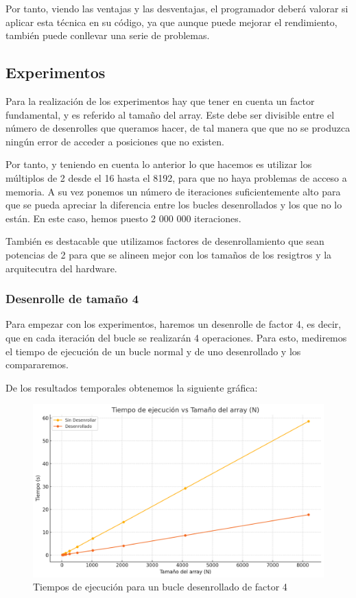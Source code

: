 \documentclass[a4paper,twocolumn]{article}
\begin{document}
Por tanto, viendo las ventajas y las desventajas, el programador deberá valorar si aplicar esta técnica en su código, ya que aunque puede mejorar el rendimiento, también puede conllevar una serie de problemas.

\subsection{Experimentos}

Para la realización de los experimentos hay que tener en cuenta un factor fundamental, y es referido al tamaño del array. Este debe ser divisible entre el número de desenrolles que queramos hacer, de tal manera que que no se produzca ningún error de acceder a posiciones que no existen.

Por tanto, y teniendo en cuenta lo anterior lo que hacemos es utilizar los múltiplos de 2 desde el 16 hasta el 8192, para que no haya problemas de acceso a memoria. A su vez ponemos un número de iteraciones suficientemente alto para que se pueda apreciar la diferencia entre los bucles desenrollados y los que no lo están. En este caso, hemos puesto 2 000 000 iteraciones.

También es destacable que utilizamos factores de desenrollamiento que sean potencias de 2 para que se alineen mejor con los tamaños de los resigtros y la arquitecutra del hardware.

\subsubsection{Desenrolle de tamaño 4}

Para empezar con los experimentos, haremos un desenrolle de factor 4, es decir, que en cada iteración del bucle se realizarán 4 operaciones. Para esto, mediremos el tiempo de ejecución de un bucle normal y de uno desenrollado y los compararemos.

De los resultados temporales obtenemos la siguiente gráfica:

\begin{figure}[H]
	\centering
	\includegraphics[width=\columnwidth]{img/4.png}
	\caption{Tiempos de ejecución para un bucle desenrollado de factor 4}
	\label{fig:times}
\end{figure}
\end{document}
